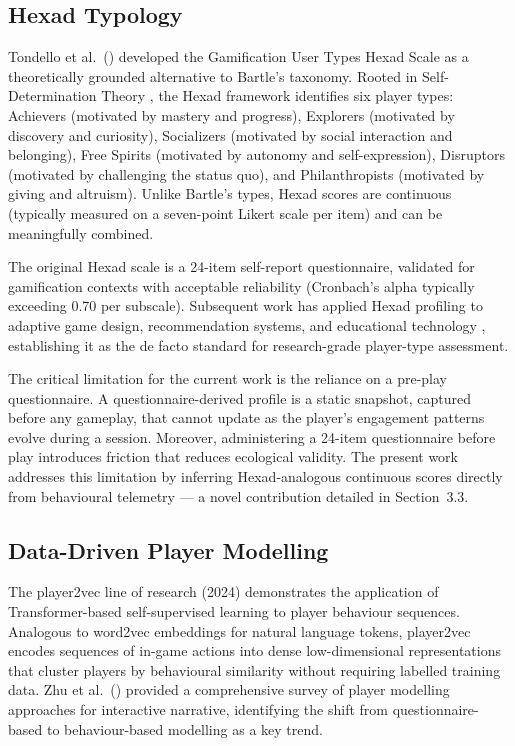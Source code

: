 \documentclass[12pt,a4paper]{report}
\begin{document}
\subsection{Hexad Typology}

Tondello et al.\ (\citeyear{tondello2016hexad}) developed the Gamification User Types Hexad Scale as a theoretically grounded alternative to Bartle's taxonomy. Rooted in Self-Determination Theory \citep{ryan2000self}, the Hexad framework identifies six player types: Achievers (motivated by mastery and progress), Explorers (motivated by discovery and curiosity), Socializers (motivated by social interaction and belonging), Free Spirits (motivated by autonomy and self-expression), Disruptors (motivated by challenging the status quo), and Philanthropists (motivated by giving and altruism). Unlike Bartle's types, Hexad scores are continuous (typically measured on a seven-point Likert scale per item) and can be meaningfully combined.

The original Hexad scale is a 24-item self-report questionnaire, validated for gamification contexts with acceptable reliability (Cronbach's alpha typically exceeding 0.70 per subscale). Subsequent work has applied Hexad profiling to adaptive game design, recommendation systems, and educational technology \citep{hamari2014does}, establishing it as the de facto standard for research-grade player-type assessment.

The critical limitation for the current work is the reliance on a pre-play questionnaire. A questionnaire-derived profile is a static snapshot, captured before any gameplay, that cannot update as the player's engagement patterns evolve during a session. Moreover, administering a 24-item questionnaire before play introduces friction that reduces ecological validity. The present work addresses this limitation by inferring Hexad-analogous continuous scores directly from behavioural telemetry --- a novel contribution detailed in Section~3.3.

\subsection{Data-Driven Player Modelling}

The player2vec line of research (2024) demonstrates the application of Transformer-based self-supervised learning to player behaviour sequences. Analogous to word2vec embeddings for natural language tokens, player2vec encodes sequences of in-game actions into dense low-dimensional representations that cluster players by behavioural similarity without requiring labelled training data. Zhu et al.\ (\citeyear{zhu2023player}) provided a comprehensive survey of player modelling approaches for interactive narrative, identifying the shift from questionnaire-based to behaviour-based modelling as a key trend.
\end{document}
